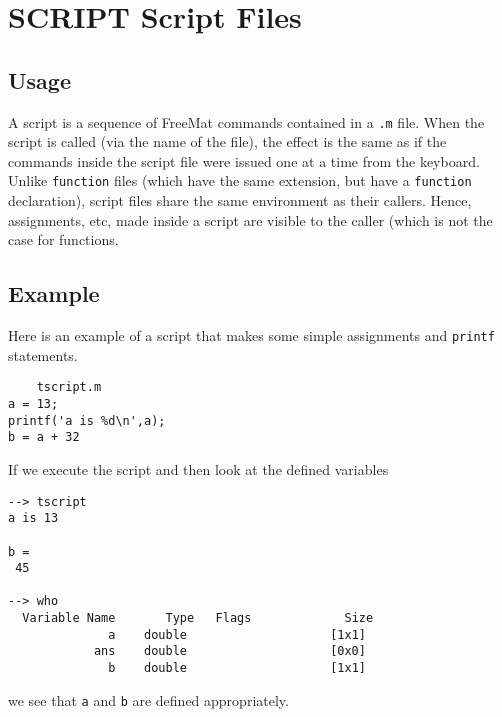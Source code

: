\section{SCRIPT Script Files}

\subsection{Usage}

A script is a sequence of FreeMat commands contained in a
\verb|.m| file.  When the script is called (via the name of the
file), the effect is the same as if the commands inside the
script file were issued one at a time from the keyboard.
Unlike \verb|function| files (which have the same extension,
but have a \verb|function| declaration), script files share
the same environment as their callers.  Hence, assignments,
etc, made inside a script are visible to the caller (which
is not the case for functions.
\subsection{Example}

Here is an example of a script that makes some simple 
assignments and \verb|printf| statements.
\begin{verbatim}
    tscript.m
a = 13;
printf('a is %d\n',a);
b = a + 32
\end{verbatim}
If we execute the script and then look at the defined variables
\begin{verbatim}
--> tscript
a is 13

b = 
 45 

--> who
  Variable Name       Type   Flags             Size
              a    double                    [1x1]
            ans    double                    [0x0]
              b    double                    [1x1]
\end{verbatim}
we see that \verb|a| and \verb|b| are defined appropriately.
